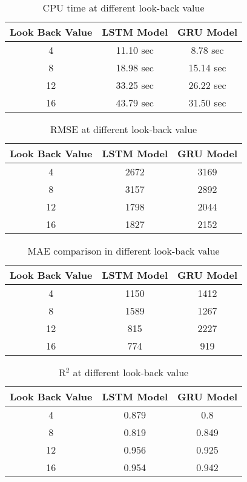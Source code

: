 \begin{table}[h]
	\captionsetup{justification=centering}
	\caption{CPU time at different look-back value }
	\centering
	\begin{tabular}{ c  c  c }
		\hline\hline
		Look Back Value & LSTM Model & GRU Model \\ 
		\hline
		4 & 11.10 sec & 8.78 sec \\
		8 & 18.98 sec & 15.14 sec \\
		12 & 33.25 sec & 26.22 sec \\
		16 & 43.79 sec & 31.50 sec \\
		\hline
	\end{tabular} 
	\label{table:result-cpu}
\end{table}

\begin{table}[h]
	\captionsetup{justification=centering}
	\caption{RMSE at different look-back value }
	\centering
	\begin{tabular}{ c  c  c }
		\hline\hline
		Look Back Value & LSTM Model & GRU Model \\ 
		\hline
		4 & 2672 & 3169 \\
		8 & 3157 & 2892 \\
		12 & 1798 & 2044 \\
		16 & 1827  & 2152 \\
		\hline
	\end{tabular} 
	\label{table:result-mae}
\end{table}
\begin{table}[h]
	\captionsetup{justification=centering}
	\caption{MAE comparison in different look-back value }
	\centering
	\begin{tabular}{ c  c  c }
		\hline\hline
		Look Back Value & LSTM Model & GRU Model \\ 
		\hline
		4 & 1150 & 1412 \\
		8 & 1589 & 1267 \\
		12 & 815 & 2227\\
		16 & 774 &  919 \\
		\hline
	\end{tabular} 
	\label{table:result-mae}
\end{table}
\begin{table}[h]
	\captionsetup{justification=centering}
	\caption{R$^2$ at different look-back value }
	\centering
	\begin{tabular}{ c  c  c }
		\hline\hline
		Look Back Value & LSTM Model & GRU Model \\ 
		\hline
		4 & 0.879 & 0.8 \\
		8 & 0.819 &  0.849 \\
		12 & 0.956 & 0.925 \\
		16 & 0.954 &  0.942 \\
		\hline
	\end{tabular} 
	\label{table:result-mae}
\end{table}
